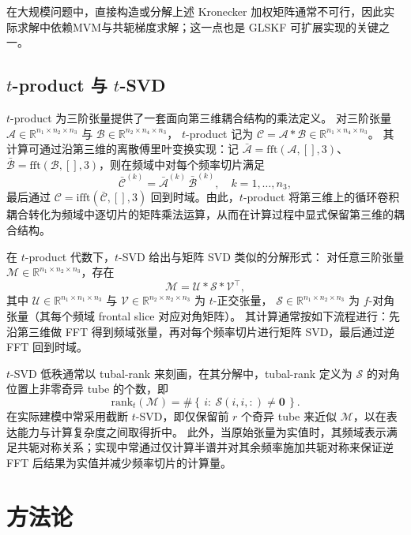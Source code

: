 \documentclass[UTF8]{ctexart}
\begin{document}
在大规模问题中，直接构造或分解上述 Kronecker 加权矩阵通常不可行，因此实际求解中依赖MVM与共轭梯度求解\cite{hestenes1952cg}；这一点也是 GLSKF 可扩展实现的关键之一\cite{lei2024glskf}。

\subsection{$t$-product 与 $t$-SVD}
$t$-product 为三阶张量提供了一套面向第三维耦合结构的乘法定义\cite{kilmer2011factorization,kilmer2013operators}。
对三阶张量 $\mathcal{A}\in\mathbb{R}^{n_1\times n_2\times n_3}$ 与 $\mathcal{B}\in\mathbb{R}^{n_2\times n_4\times n_3}$，
$t$-product 记为 $\mathcal{C}=\mathcal{A}*\mathcal{B}\in\mathbb{R}^{n_1\times n_4\times n_3}$。
其计算可通过沿第三维的离散傅里叶变换实现：记 $\bar{\mathcal{A}}=\mathrm{fft}(\mathcal{A},[],3)$、
$\bar{\mathcal{B}}=\mathrm{fft}(\mathcal{B},[],3)$，则在频域中对每个频率切片满足
\[
\bar{\mathcal{C}}^{(k)}=\bar{\mathcal{A}}^{(k)}\,\bar{\mathcal{B}}^{(k)},\quad k=1,\ldots,n_3,
\label{eq:tprod_fft}
\]
最后通过 $\mathcal{C}=\mathrm{ifft}(\bar{\mathcal{C}},[],3)$ 回到时域。由此，$t$-product 将第三维上的循环卷积耦合转化为频域中逐切片的矩阵乘法运算，从而在计算过程中显式保留第三维的耦合结构\cite{kilmer2013operators}。


在 $t$-product 代数下，$t$-SVD 给出与矩阵 SVD 类似的分解形式\cite{kilmer2011factorization,zhang2017tsvd}：
对任意三阶张量 $\mathcal{M}\in\mathbb{R}^{n_1\times n_2\times n_3}$，存在\[
\mathcal{M}=\mathcal{U}*\mathcal{S}*\mathcal{V}^{\top},
\label{eq:tsvd}
\]
其中 $\mathcal{U}\in\mathbb{R}^{n_1\times n_1\times n_3}$ 与 $\mathcal{V}\in\mathbb{R}^{n_2\times n_2\times n_3}$ 为 $t$-正交张量，
$\mathcal{S}\in\mathbb{R}^{n_1\times n_2\times n_3}$ 为 $f$-对角张量（其每个频域 frontal slice 对应对角矩阵）。
其计算通常按如下流程进行：先沿第三维做 FFT 得到频域张量，再对每个频率切片进行矩阵 SVD，最后通过逆 FFT 回到时域\cite{kilmer2013operators,zhang2017tsvd}。

$t$-SVD 低秩通常以 tubal-rank 来刻画，在其分解中，tubal-rank 定义为 $\mathcal{S}$ 的对角位置上非零奇异 tube 的个数，即
\[
\mathrm{rank}_t(\mathcal{M})=\#\left\{\,i:\ \mathcal{S}(i,i,:)\neq \mathbf{0}\,\right\}.
\]
在实际建模中常采用截断 $t$-SVD，即仅保留前 $r$ 个奇异 tube 来近似 $\mathcal{M}$，以在表达能力与计算复杂度之间取得折中\cite{zhang2017tsvd}。
此外，当原始张量为实值时，其频域表示满足共轭对称关系；实现中常通过仅计算半谱并对其余频率施加共轭对称来保证逆 FFT 后结果为实值并减少频率切片的计算量\cite{kilmer2013operators}。
\section{方法论}
\end{document}
